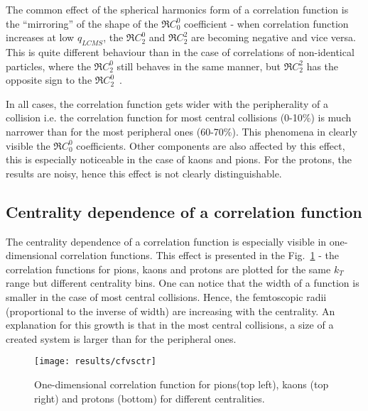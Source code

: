       The common effect of the spherical harmonics form of a correlation function is the ``mirroring'' of the shape of the $\Re C^0_0$ coefficient - when correlation function increases at low $q_{LCMS}$, the $\Re C^0_2$ and $\Re C^2_2$ are becoming negative and vice versa.
      This is quite different behaviour than in the case of correlations of non-identical particles, where the $\Re C^0_2$ still behaves in the same manner, but $\Re C_2^2$ has the opposite sign to the $\Re C^0_2$~\cite{nonidfemto}.

      In all cases, the correlation function gets wider with the peripherality of a collision i.e. the correlation function for most central collisions (0-10\%) is much narrower than for the most peripheral ones (60-70\%).
      This phenomena in clearly visible the $\Re C^0_0$ coefficients.
      Other components are also affected by this effect, this is especially noticeable in the case of kaons and pions.
      For the protons, the results are noisy, hence this effect is not clearly distinguishable.


    \FloatBarrier
    \clearpage
    \subsection{Centrality dependence of a correlation function}
      The centrality dependence of a correlation function is especially visible in one-dimensional correlation functions.
      This effect is presented in the Fig.~\ref{fig:centr_dep} - the correlation functions for pions, kaons and protons are plotted for the same $k_T$ range but different centrality bins.
      One can notice that the width of a function is smaller in the case of most central collisions.
      Hence, the femtoscopic radii (proportional to the inverse of width) are increasing with the centrality.
      An explanation for this growth is that in the most central collisions, a size of a created system is larger than for the peripheral ones.
      \begin{figure}[h]
        \centering
        \centerline{\texttt{[image: results/cfvsctr]}}
        \caption{One-dimensional correlation function for pions(top left), kaons (top right) and protons (bottom) for different centralities.}
      \label{fig:centr_dep}
      \end{figure}
    \FloatBarrier
    \clearpage
